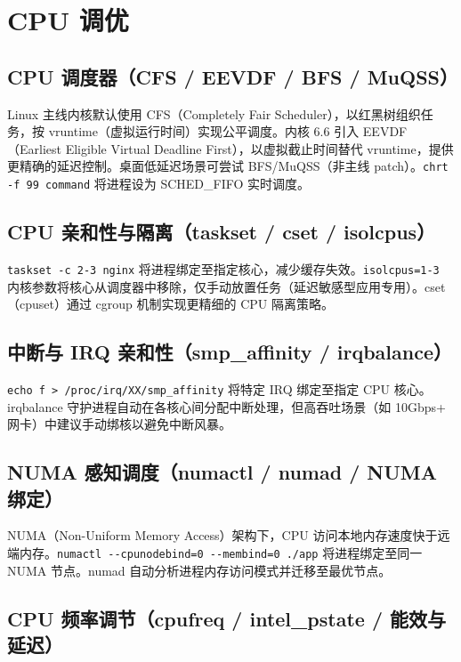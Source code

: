 \documentclass[12pt,UTF8]{ctexbook}
\begin{document}
  \section{CPU 调优}
    \subsection{CPU 调度器（CFS / EEVDF / BFS / MuQSS）}

Linux 主线内核默认使用 CFS（Completely Fair Scheduler），以红黑树组织任务，按 vruntime（虚拟运行时间）实现公平调度。内核 6.6 引入 EEVDF（Earliest Eligible Virtual Deadline First），以虚拟截止时间替代 vruntime，提供更精确的延迟控制。桌面低延迟场景可尝试 BFS/MuQSS（非主线 patch）。\verb|chrt -f 99 command| 将进程设为 SCHED\_FIFO 实时调度。

    \subsection{CPU 亲和性与隔离（taskset / cset / isolcpus）}

\verb|taskset -c 2-3 nginx| 将进程绑定至指定核心，减少缓存失效。\verb|isolcpus=1-3| 内核参数将核心从调度器中移除，仅手动放置任务（延迟敏感型应用专用）。cset（cpuset）通过 cgroup 机制实现更精细的 CPU 隔离策略。

    \subsection{中断与 IRQ 亲和性（smp\_affinity / irqbalance）}

\verb|echo f > /proc/irq/XX/smp_affinity| 将特定 IRQ 绑定至指定 CPU 核心。irqbalance 守护进程自动在各核心间分配中断处理，但高吞吐场景（如 10Gbps+ 网卡）中建议手动绑核以避免中断风暴。

    \subsection{NUMA 感知调度（numactl / numad / NUMA 绑定）}

NUMA（Non-Uniform Memory Access）架构下，CPU 访问本地内存速度快于远端内存。\verb|numactl --cpunodebind=0 --membind=0 ./app| 将进程绑定至同一 NUMA 节点。numad 自动分析进程内存访问模式并迁移至最优节点。

    \subsection{CPU 频率调节（cpufreq / intel\_pstate / 能效与延迟）}
\end{document}
